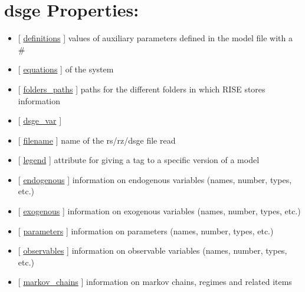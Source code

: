 \documentclass[letterpaper,10pt,english]{sphinxmanual}
\begin{document}
\section{dsge Properties:}
\label{classes/models/@dsge/dsge:dsge-properties}\begin{itemize}
\item {} 
{[} {\hyperref[classes/models/@dsge/dsge:definitions]{definitions}} {]}   values of auxiliary parameters defined in the model file with a \#

\item {} 
{[} {\hyperref[classes/models/@dsge/dsge:equations]{equations}} {]} of the system

\item {} 
{[} {\hyperref[classes/models/@dsge/dsge:folders-paths]{folders\_paths}} {]}   paths for the different folders in which RISE stores information

\item {} 
{[} {\hyperref[classes/models/@dsge/dsge:dsge-var]{dsge\_var}} {]}

\item {} 
{[} {\hyperref[classes/models/@dsge/dsge:filename]{filename}} {]}   name of the rs/rz/dsge file read

\item {} 
{[} {\hyperref[classes/models/@dsge/dsge:legend]{legend}} {]}   attribute for giving a tag to a specific version of a model

\item {} 
{[} {\hyperref[classes/models/@dsge/dsge:endogenous]{endogenous}} {]}   information on endogenous variables (names, number, types, etc.)

\item {} 
{[} {\hyperref[classes/models/@dsge/dsge:exogenous]{exogenous}} {]}   information on exogenous variables (names, number, types, etc.)

\item {} 
{[} {\hyperref[classes/models/@dsge/dsge:parameters]{parameters}} {]}   information on parameters (names, number, types, etc.)

\item {} 
{[} {\hyperref[classes/models/@dsge/dsge:observables]{observables}} {]}   information on observable variables (names, number, types, etc.)

\item {} 
{[} {\hyperref[classes/models/@dsge/dsge:markov-chains]{markov\_chains}} {]}   information on markov chains, regimes and related items


\end{itemize}
\end{document}
